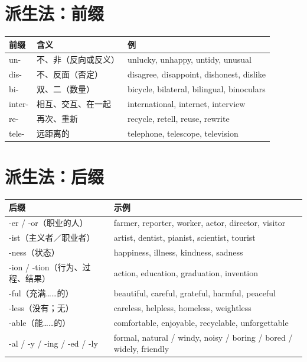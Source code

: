 \documentclass[11pt,a4paper]{ctexart}
\begin{document}
\section{派生法：前缀}
\begin{center}
\begin{tabular}{p{2.4cm}p{4.6cm}p{5.4cm}}
\hline
\textbf{前缀} & \textbf{含义} & \textbf{例}\\
\hline
un- & 不、非（反向或反义） & unlucky, unhappy, untidy, unusual\\
dis- & 不、反面（否定） & disagree, disappoint, dishonest, dislike\\
bi- & 双、二（数量） & bicycle, bilateral, bilingual, binoculars\\
inter- & 相互、交互、在一起 & international, internet, interview\\
re- & 再次、重新 & recycle, retell, reuse, rewrite\\
tele- & 远距离的 & telephone, telescope, television\\
\hline
\end{tabular}
\end{center}

\section{派生法：后缀}
\begin{center}
\begin{tabular}{p{4.0cm}p{8.0cm}}
\hline
\textbf{后缀} & \textbf{示例}\\
\hline
-er / -or（职业的人） & farmer, reporter, worker, actor, director, visitor\\
-ist（主义者／职业者） & artist, dentist, pianist, scientist, tourist\\
-ness（状态） & happiness, illness, kindness, sadness\\
-ion / -tion（行为、过程、结果） & action, education, graduation, invention\\
-ful（充满……的） & beautiful, careful, grateful, harmful, peaceful\\
-less（没有；无） & careless, helpless, homeless, weightless\\
-able（能……的） & comfortable, enjoyable, recyclable, unforgettable\\
-al / -y / -ing / -ed / -ly & formal, natural / windy, noisy / boring / bored / widely, friendly\\
\hline
\end{tabular}
\end{center}
\end{document}
